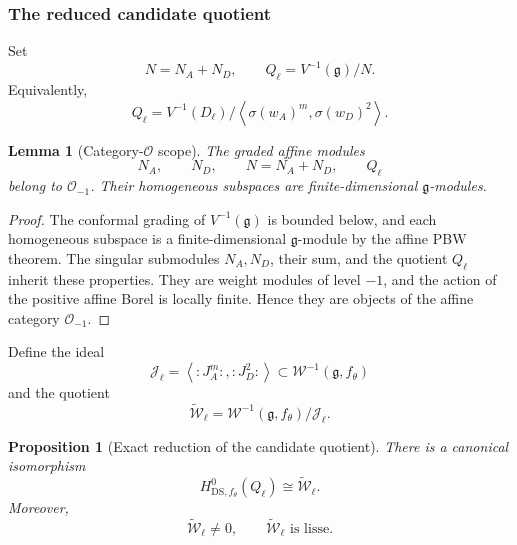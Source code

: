 \documentclass[11pt,reqno]{amsart}
\newtheorem{lemma}[theorem]{Lemma}
\newtheorem{proposition}[theorem]{Proposition}
\theoremstyle{definition}
\theoremstyle{remark}
\begin{document}
\subsubsection{The reduced candidate quotient}


Set
\begin{equation*}
  N=N_A+N_D,
  \qquad
  Q_\ell=V^{-1}(\mathfrak g)/N.
\end{equation*}
Equivalently,
\begin{equation*}
  Q_\ell
  =
  V^{-1}(D_\ell)
  \Big/
  \left\langle
    \sigma(w_A)^m,
    \sigma(w_D)^2
  \right\rangle.
\end{equation*}

\begin{lemma}[Category-\(\mathcal O\) scope]
\label{dl:lem:Dl-candidate-modules-in-category-O}
The graded affine modules
\begin{equation*}
  N_A,\qquad N_D,\qquad N=N_A+N_D,\qquad Q_\ell
\end{equation*}
belong to \(\mathcal O_{-1}\).  Their homogeneous subspaces are
finite-dimensional \(\mathfrak g\)-modules.
\end{lemma}

\begin{proof}
The conformal grading of \(V^{-1}(\mathfrak g)\) is bounded below,
and each homogeneous subspace is a finite-dimensional
\(\mathfrak g\)-module by the affine PBW theorem.  The singular
submodules \(N_A,N_D\), their sum, and the quotient \(Q_\ell\) inherit
these properties.  They are weight modules of level \(-1\), and the
action of the positive affine Borel is locally finite.  Hence they are
objects of the affine category \(\mathcal O_{-1}\).
\end{proof}
Define the ideal
\begin{equation}
  \mathcal J_\ell
  =
  \left\langle
    :J_A^m:,
    :J_D^2:
  \right\rangle
  \subset
  \mathcal W^{-1}(\mathfrak g,f_\theta)
  \label{dl:eq:Dl-reduced-current-ideal}
\end{equation}
and the quotient
\begin{equation*}
  \widetilde{\mathcal W}_\ell
  =
  \mathcal W^{-1}(\mathfrak g,f_\theta)/
  \mathcal J_\ell.
\end{equation*}

\begin{proposition}[Exact reduction of the candidate quotient]
\label{dl:prop:Dl-exact-reduction-candidate-quotient}
There is a canonical isomorphism
\begin{equation}
  H^0_{\mathrm{DS},f_\theta}(Q_\ell)
  \cong
  \widetilde{\mathcal W}_\ell.
  \label{dl:eq:Dl-exact-reduction-Q}
\end{equation}
Moreover,
\begin{equation}
  \widetilde{\mathcal W}_\ell\ne0,
  \qquad
  \widetilde{\mathcal W}_\ell
  \text{ is lisse}.
  \label{dl:eq:Dl-Wtilde-nonzero-lisse}
\end{equation}
\end{proposition}
\end{document}
